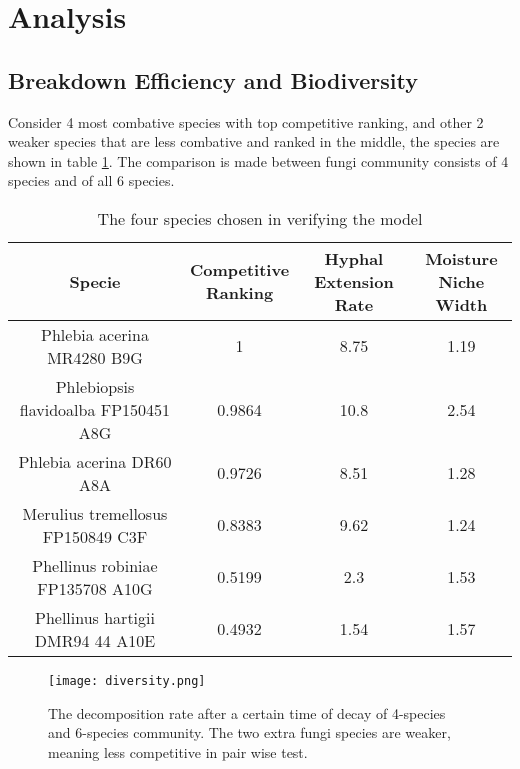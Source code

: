 \section{Analysis}\label{sec:analysis}

\subsection{Breakdown Efficiency and Biodiversity}

Consider 4 most combative species with top competitive ranking, and other 2 weaker species that are less combative and ranked in the middle, the species are shown in table \ref{tb:bio-div}. The comparison is made between fungi community consists of 4 species and of all 6 species.

\begin{table}\caption{The four species chosen in verifying the model}\label{tb:bio-div}
    \centering
    \begin{tabular}{c|ccc}
        \toprule
        Specie                               & \makecell[c]{Competitive               \\Ranking} & \makecell[c]{Hyphal\\Extension Rate} & \makecell[c]{Moisture\\Niche Width} \\
        \midrule
        Phlebia acerina MR4280 B9G           & 1                        & 8.75 & 1.19 \\
        Phlebiopsis flavidoalba FP150451 A8G & 0.9864                   & 10.8 & 2.54 \\
        Phlebia acerina DR60 A8A             & 0.9726                   & 8.51 & 1.28 \\
        Merulius tremellosus FP150849 C3F    & 0.8383                   & 9.62 & 1.24 \\
        Phellinus robiniae FP135708 A10G     & 0.5199                   & 2.3  & 1.53 \\
        Phellinus hartigii DMR94 44 A10E     & 0.4932                   & 1.54 & 1.57 \\
        \bottomrule
    \end{tabular}
\end{table}

\begin{figure}
    \begin{minipage}{0.6\textwidth}
        \texttt{[image: diversity.png]}
    \end{minipage}
    \begin{minipage}{0.4\textwidth}
        \caption{The decomposition rate after a certain time of decay of 4-species and 6-species community. The two extra fungi species are weaker, meaning less competitive in pair wise test.}\label{fig:diversity}
    \end{minipage}
\end{figure}

